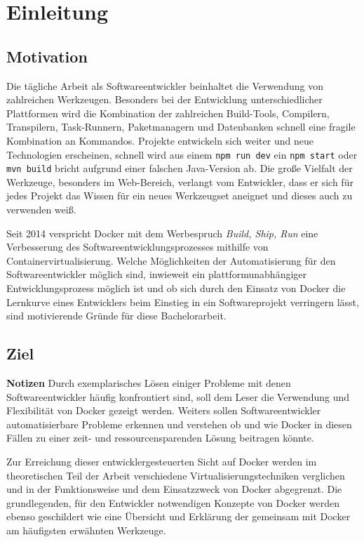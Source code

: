 \chapter{Einleitung}
\section{Motivation}
Die tägliche Arbeit als Softwareentwickler beinhaltet die Verwendung von zahlreichen Werkzeugen.
Besonders bei der Entwicklung unterschiedlicher Plattformen wird die Kombination der zahlreichen Build-Tools, Compilern, Transpilern, Task-Runnern, Paketmanagern und Datenbanken schnell eine fragile Kombination an Kommandos.
Projekte entwickeln sich weiter und neue Technologien erscheinen, schnell wird aus einem \texttt{npm run dev} ein \texttt{npm start} oder \texttt{mvn build} bricht aufgrund einer falschen Java-Version ab.
Die große Vielfalt der Werkzeuge, besonders im Web-Bereich, verlangt vom Entwickler, dass er sich für jedes Projekt das Wissen für ein neues Werkzeugset aneignet und dieses auch zu verwenden weiß.

Seit 2014 verspricht Docker mit dem Werbespruch \emph{Build, Ship, Run} eine Verbesserung des Softwareentwicklungsprozesses mithilfe von Containervirtualisierung.
Welche Möglichkeiten der Automatisierung für den Softwareentwickler möglich sind, inwieweit ein plattformunabhängiger Entwicklungsprozess möglich ist und ob sich durch den Einsatz von Docker die Lernkurve eines Entwicklers beim Einstieg in ein Softwareprojekt verringern lässt, sind motivierende Gründe für diese Bachelorarbeit.

\section{Ziel}
\textbf{Notizen}
Durch exemplarisches Lösen einiger Probleme mit denen Softwareentwickler häufig konfrontiert sind, soll dem Leser die Verwendung und Flexibilität von Docker gezeigt werden.
Weiters sollen Softwareentwickler automatisierbare Probleme erkennen und verstehen ob und wie Docker in diesen Fällen zu einer zeit- und ressourcensparenden Lösung beitragen könnte.

Zur Erreichung dieser entwicklergesteuerten Sicht auf Docker werden im theoretischen Teil der Arbeit verschiedene Virtualisierungstechniken verglichen und in der Funktionsweise und dem Einsatzzweck von Docker abgegrenzt.
Die grundlegenden, für den Entwickler notwendigen Konzepte von Docker werden ebenso geschildert wie eine Übersicht und Erklärung der gemeinsam mit Docker am häufigsten erwähnten Werkzeuge.

